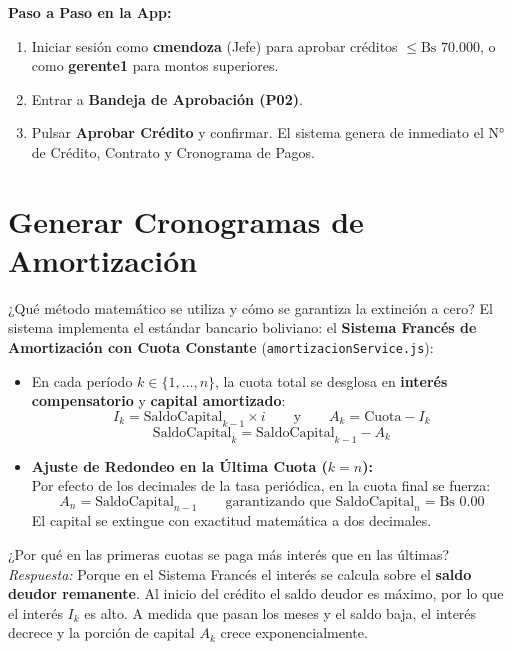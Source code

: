 \documentclass[11pt,letterpaper]{article}
\begin{document}
\begin{demobox}
\textbf{Paso a Paso en la App:}
\begin{enumerate}
    \item Iniciar sesión como \textbf{cmendoza} (Jefe) para aprobar créditos $\le \text{Bs } 70.000$, o como \textbf{gerente1} para montos superiores.
    \item Entrar a \textbf{Bandeja de Aprobación (P02)}.
    \item Pulsar \textbf{Aprobar Crédito} y confirmar. El sistema genera de inmediato el N° de Crédito, Contrato y Cronograma de Pagos.
\end{enumerate}
\end{demobox}

\section{Generar Cronogramas de Amortización}

\begin{respuestabox}{¿Qué método matemático se utiliza y cómo se garantiza la extinción a cero?}
El sistema implementa el estándar bancario boliviano: el \textbf{Sistema Francés de Amortización con Cuota Constante} (\texttt{amortizacionService.js}):
\begin{itemize}
    \item En cada período $k \in \{1, \dots, n\}$, la cuota total se desglosa en \textbf{interés compensatorio} y \textbf{capital amortizado}:
    $$I_k = \text{SaldoCapital}_{k-1} \times i \qquad \text{y} \qquad A_k = \text{Cuota} - I_k$$
    $$\text{SaldoCapital}_k = \text{SaldoCapital}_{k-1} - A_k$$
    \item \textbf{Ajuste de Redondeo en la Última Cuota ($k = n$):}\\
    Por efecto de los decimales de la tasa periódica, en la cuota final se fuerza:
    $$A_n = \text{SaldoCapital}_{n-1} \qquad \text{garantizando que } \text{SaldoCapital}_n = \text{Bs } 0.00$$
    El capital se extingue con exactitud matemática a dos decimales.
\end{itemize}
\end{respuestabox}

\begin{preguntatrampabox}{¿Por qué en las primeras cuotas se paga más interés que en las últimas?}
\textit{Respuesta:} Porque en el Sistema Francés el interés se calcula sobre el \textbf{saldo deudor remanente}. Al inicio del crédito el saldo deudor es máximo, por lo que el interés $I_k$ es alto. A medida que pasan los meses y el saldo baja, el interés decrece y la porción de capital $A_k$ crece exponencialmente.
\end{preguntatrampabox}
\end{document}

